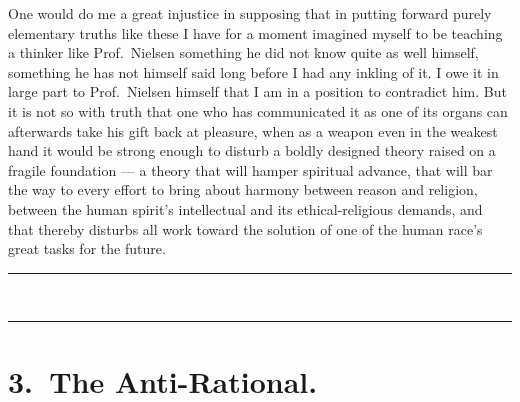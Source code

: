 \documentclass[12pt,a4paper]{book}
\newcommand{\opage}[1]{\marginnote{\footnotesize\textit{[#1]}}}
\begin{document}
One would do me a great injustice in supposing that in putting forward purely
elementary truths like these I have for a moment imagined myself to be teaching
a thinker like Prof.\ Nielsen something he did not know quite as well himself,
something he has not himself said long before I had any inkling of it. I owe it
in large part to Prof.\ Nielsen himself that I am in a position to contradict
him. But it is not so with truth that one who has communicated it as one of its
organs can afterwards take his gift back at pleasure, when as a weapon even in
the weakest hand it would be strong enough to
\opage{46}disturb a boldly designed theory raised on a fragile foundation ---
a theory that will hamper spiritual advance, that will bar the way to every
effort to bring about harmony between reason and religion, between the human
spirit's intellectual and its ethical-religious demands, and that thereby
disturbs all work toward the solution of one of the human race's great tasks
for the future.

\begin{center}
\rule{2cm}{0.4pt}\\[-4pt]
\rule{2cm}{0.4pt}
\end{center}

\chapter*{3.\ The Anti-Rational.}
\label{ch:3}
\end{document}
